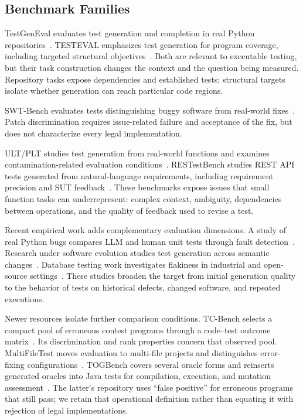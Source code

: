 \subsection{Benchmark Families}
TestGenEval evaluates test generation and completion in real Python repositories~\cite{B01}. TESTEVAL emphasizes test generation for program coverage, including targeted structural objectives~\cite{B02}. Both are relevant to executable testing, but their task construction changes the context and the question being measured. Repository tasks expose dependencies and established tests; structural targets isolate whether generation can reach particular code regions.

SWT-Bench evaluates tests distinguishing buggy software from real-world fixes~\cite{B03}. Patch discrimination requires issue-related failure and acceptance of the fix, but does not characterize every legal implementation.

ULT/PLT studies test generation from real-world functions and examines contamination-related evaluation conditions~\cite{B04}. RESTestBench studies REST API tests generated from natural-language requirements, including requirement precision and SUT feedback~\cite{B05}. These benchmarks expose issues that small function tasks can underrepresent: complex context, ambiguity, dependencies between operations, and the quality of feedback used to revise a test.

Recent empirical work adds complementary evaluation dimensions. A study of real Python bugs compares LLM and human unit tests through fault detection~\cite{E01}. Research under software evolution studies test generation across semantic changes~\cite{E02}. Database testing work investigates flakiness in industrial and open-source settings~\cite{E03}. These studies broaden the target from initial generation quality to the behavior of tests on historical defects, changed software, and repeated executions.

Newer resources isolate further comparison conditions. TC-Bench selects a compact pool of erroneous contest programs through a code--test outcome matrix~\cite{B06}. Its discrimination and rank properties concern that observed pool. MultiFileTest moves evaluation to multi-file projects and distinguishes error-fixing configurations~\cite{B07}. TOGBench covers several oracle forms and reinserts generated oracles into Java tests for compilation, execution, and mutation assessment~\cite{B08}. The latter's repository uses ``false positive'' for erroneous programs that still pass; we retain that operational definition rather than equating it with rejection of legal implementations.

